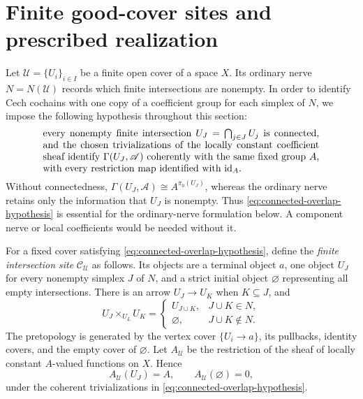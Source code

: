 \section{Finite good-cover sites and prescribed realization}
\label{sec:homological-visibility}

Let \(\mathcal U=\{U_i\}_{i\in I}\) be a finite open cover of a space
\(X\).  Its ordinary nerve \(N=N(\mathcal U)\) records which finite
intersections are nonempty.  In order to identify Cech cochains with one
copy of a coefficient group for each simplex of \(N\), we impose the
following hypothesis throughout this section:
\begin{equation}\label{eq:connected-overlap-hypothesis}
 \begin{minipage}{0.82\textwidth}
 every nonempty finite intersection \(U_J=\bigcap_{j\in J}U_j\) is
 connected, and the chosen trivializations of the locally constant
 coefficient sheaf identify \(\Gamma(U_J,\mathscr A)\) coherently with
 the same fixed group \(A\), with every restriction map identified with
 \(\operatorname{id}_A\).
 \end{minipage}
\end{equation}
Without connectedness,
\(\Gamma(U_J,\mathscr A)\cong A^{\pi_0(U_J)}\), whereas the ordinary nerve
retains only the information that \(U_J\) is nonempty.  Thus
\eqref{eq:connected-overlap-hypothesis} is essential for the ordinary-nerve
formulation below.  A component nerve or local coefficients would be needed
without it.

For a fixed cover satisfying \eqref{eq:connected-overlap-hypothesis}, define
the \emph{finite intersection site} \(\mathcal C_{\mathcal U}\) as follows.
Its objects are a terminal object \(a\), one object \(U_J\) for every
nonempty simplex \(J\) of \(N\), and a strict initial object \(\varnothing\)
representing all empty intersections.  There is an arrow
\(U_J\to U_K\) when \(K\subseteq J\), and
\[
 U_J\times_{U_L}U_K=
 \begin{cases}
 U_{J\cup K},&J\cup K\in N,\\
 \varnothing,&J\cup K\notin N.
 \end{cases}
\]
The pretopology is generated by the vertex cover \(\{U_i\to a\}\), its
pullbacks, identity covers, and the empty cover of \(\varnothing\).  Let
\(A_{\mathcal U}\) be the restriction of the sheaf of locally constant
\(A\)-valued functions on \(X\).  Hence
\[
 A_{\mathcal U}(U_J)=A,
 \qquad A_{\mathcal U}(\varnothing)=0,
\]
under the coherent trivializations in
\eqref{eq:connected-overlap-hypothesis}.

